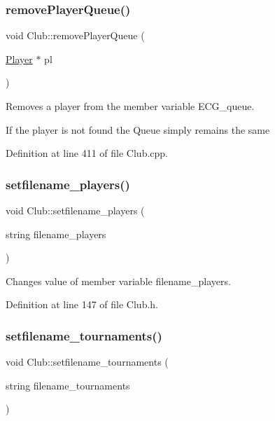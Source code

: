 \subsubsection{\texorpdfstring{remove\+Player\+Queue()}{removePlayerQueue()}}
{\footnotesize\ttfamily void Club\+::remove\+Player\+Queue (\begin{DoxyParamCaption}\item[{\hyperlink{class_player}{Player} $\ast$}]{pl }\end{DoxyParamCaption})}



Removes a player from the member variable E\+C\+G\+\_\+queue. 

If the player is not found the Queue simply remains the same 

Definition at line 411 of file Club.\+cpp.

\hypertarget{class_club_a215b1c939a82ae2d442d05bc58457cd4}{}\label{class_club_a215b1c939a82ae2d442d05bc58457cd4} 
\subsubsection{\texorpdfstring{setfilename\+\_\+players()}{setfilename\_players()}}
{\footnotesize\ttfamily void Club\+::setfilename\+\_\+players (\begin{DoxyParamCaption}\item[{string}]{filename\+\_\+players }\end{DoxyParamCaption})\hspace{0.3cm}{\ttfamily [inline]}}



Changes value of member variable filename\+\_\+players. 



Definition at line 147 of file Club.\+h.

\hypertarget{class_club_a5bd4d91fd403f73a9b74778568e3e639}{}\label{class_club_a5bd4d91fd403f73a9b74778568e3e639} 
\subsubsection{\texorpdfstring{setfilename\+\_\+tournaments()}{setfilename\_tournaments()}}
{\footnotesize\ttfamily void Club\+::setfilename\+\_\+tournaments (\begin{DoxyParamCaption}\item[{string}]{filename\+\_\+tournaments }\end{DoxyParamCaption})\hspace{0.3cm}{\ttfamily [inline]}}



